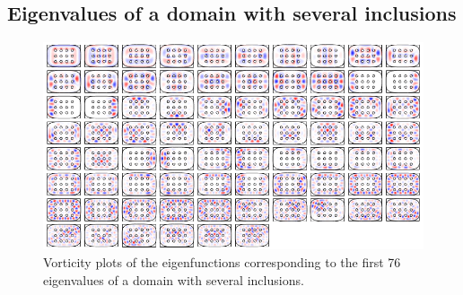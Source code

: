 %


\subsection{Eigenvalues of a domain with several inclusions}

\begin{figure}
  \centering
  \includegraphics[width=\textwidth]{fig/many_inclusions_gallery}
  \caption{Vorticity plots of the eigenfunctions corresponding
  to the first 76 eigenvalues of a domain with several inclusions.}
  \label{fig:many_inclusions_gallery}
\end{figure}

